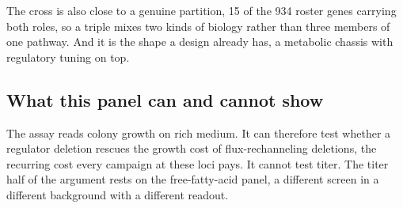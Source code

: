 The cross is also close to a genuine partition, 15 of the 934 roster genes
carrying both roles, so a triple mixes two kinds of biology rather than three
members of one pathway. And it is the shape a design already has, a metabolic
chassis with regulatory tuning on top.

\subsection{What this panel can and cannot show}

The assay reads colony growth on rich medium. It can therefore test whether a
regulator deletion rescues the growth cost of flux-rechanneling deletions, the
recurring cost every campaign at these loci pays. It cannot test titer. The titer
half of the argument rests on the free-fatty-acid panel, a different screen in a
different background with a different readout.
